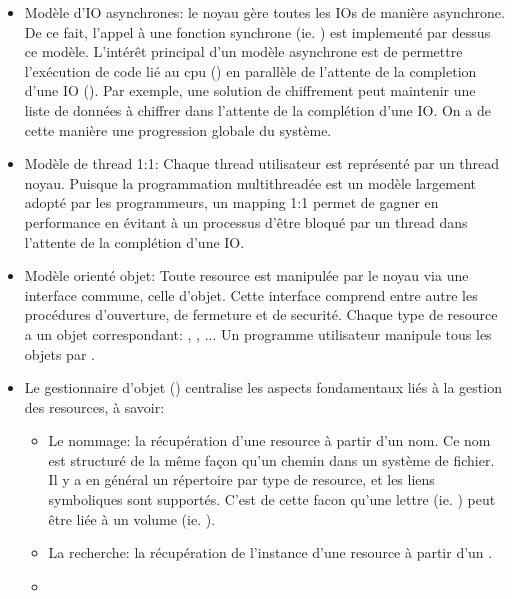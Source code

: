 \begin{correction}
\begin{itemize}
  \item
    Mod\`{e}le d'IO asynchrones: le noyau g\`{e}re toutes les IOs de mani\`{e}re
    asynchrone. De ce fait, l'appel \`{a} une fonction synchrone (ie. )
    est implement\'{e} par dessus ce mod\`{e}le. L'int\'{e}r\^{e}t principal d'un
    mod\`{e}le asynchrone est de permettre l'ex\'{e}cution de code li\'{e} au cpu
    () en parall\`{e}le de l'attente de la completion d'une IO
    (). Par exemple, une solution de chiffrement peut maintenir une liste
    de donn\'{e}es \`{a} chiffrer dans l'attente de la compl\'{e}tion d'une IO. On a de
    cette mani\`{e}re une progression globale du syst\`{e}me.
  \item
    Mod\`{e}le de thread 1:1: Chaque thread utilisateur est repr\'{e}sent\'{e} par
    un thread noyau. Puisque la programmation multithread\'{e}e est un mod\`{e}le
    largement adopt\'{e} par les programmeurs, un mapping 1:1 permet de gagner en
    performance en \'{e}vitant \`{a} un processus d'\^{e}tre bloqu\'{e} par un
    thread dans l'attente de la compl\'{e}tion d'une IO.
  \item
    Mod\`{e}le orient\'{e} objet: Toute resource est manipul\'{e}e par le noyau
    via une interface commune, celle d'objet. Cette interface comprend entre autre
    les proc\'{e}dures d'ouverture, de fermeture et de securit\'{e}. Chaque type de
    resource a un objet correspondant: , ,
     ... Un programme utilisateur manipule tous les objets
    par .
  \item
    Le gestionnaire d'objet () centralise les aspects fondamentaux
    li\'{e}s \`{a} la gestion des resources, \`{a} savoir:
    \begin{itemize}
      \item
      Le nommage: la r\'{e}cup\'{e}ration d'une resource \`{a} partir d'un nom. Ce
      nom est structur\'{e} de la m\^{e}me fa\c{c}on qu'un chemin dans un syst\`{e}me
      de fichier. Il y a en g\'{e}n\'{e}ral un r\'{e}pertoire par type de resource,
      et les liens symboliques sont support\'{e}s. C'est de cette facon qu'une lettre
      (ie. ) peut \^{e}tre li\'{e}e \`{a} un volume (ie. ).
      \item
      La recherche: la r\'{e}cup\'{e}ration de l'instance d'une resource \`{a} partir
      d'un .
      \item

\end{itemize}
\end{itemize}
\end{correction}
